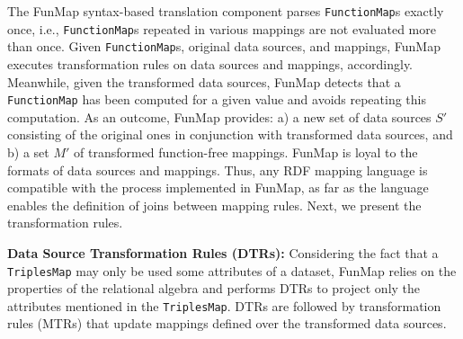 The FunMap syntax-based translation component parses \verb|FunctionMap|s exactly once, i.e., \verb|FunctionMap|s repeated in various mappings are not evaluated more than once. Given \verb|FunctionMap|s, original data sources, and mappings, FunMap executes transformation rules on data sources and mappings, accordingly. Meanwhile, given the transformed data sources, FunMap detects that a \verb|FunctionMap| has been computed for a given value and avoids repeating this computation. As an outcome, FunMap provides: a) a new set of data sources $S'$ consisting of the original ones in conjunction with transformed data sources,  and b) a set $M'$ of transformed function-free mappings. FunMap is loyal to the formats of data sources and mappings. Thus, any RDF mapping language is compatible with the process implemented in FunMap, as far as the language enables the definition of joins between mapping rules. Next, we present the transformation rules. 

\noindent\textbf{Data Source Transformation Rules (DTRs):}
Considering the fact that a \verb|TriplesMap| may only be used some attributes of a dataset, FunMap relies on the properties of the relational algebra and performs DTRs to project only the attributes mentioned in the \verb|TriplesMap|. DTRs are followed by transformation rules (MTRs) that update mappings defined over the transformed data sources. 


